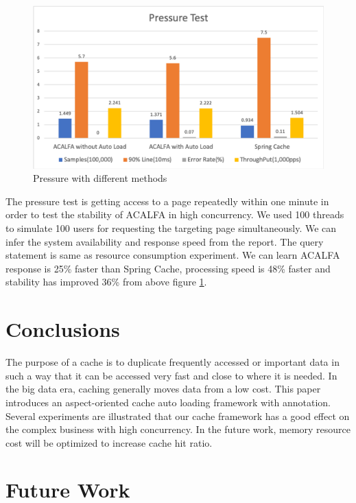 \documentclass{singlecol-new}
\theoremstyle{TH}{
\newtheorem{lemma}{Lemma}
\newtheorem{theorem}[lemma]{Theorem}
\newtheorem{corrolary}[lemma]{Corrolary}
\newtheorem{conjecture}[lemma]{Conjecture}
\newtheorem{proposition}[lemma]{Proposition}
\newtheorem{claim}[lemma]{Claim}
\newtheorem{stheorem}[lemma]{Wrong Theorem}
}
\theoremstyle{THrm}{
\newtheorem{definition}{Definition}[section]
\newtheorem{question}{Question}[section]
\newtheorem{remark}{Remark}
\newtheorem{scheme}{Scheme}
}
\theoremstyle{THhit}{
\newtheorem{case}{Case}[section]
}
\begin{document}
 \begin{figure}
     \centering
     \includegraphics[width=1\linewidth]{img/pressuretest.png}
     \caption{Pressure with different methods}
     \label{pressuretest}
 \end{figure}

 The pressure test is getting access to a page repeatedly within one minute in order to test the stability of ACALFA in high concurrency. We used 100 threads to simulate 100 users for requesting the targeting page simultaneously. We can infer the system availability and response speed from the report. The query statement is same as resource consumption experiment. We can learn ACALFA response is 25\% faster than Spring Cache, processing speed is 48\% faster and stability has improved 36\% from above figure \ref{pressuretest}.

\section{Conclusions}
\label{Conclusions}

The purpose of a cache is to duplicate frequently accessed or important data in such a way that it can be accessed very fast and close to where it is needed. In the big data era, caching generally moves data from a low cost. This paper introduces an aspect-oriented cache auto loading framework with annotation. Several experiments are illustrated that our cache framework has a good effect on the complex business with high concurrency. In the future work, memory resource cost will be optimized to increase cache hit ratio.

\section{Future Work}
\label{futurework}
\end{document}
